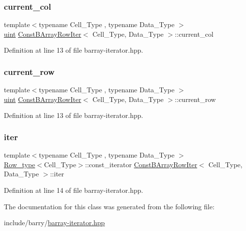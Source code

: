 \subsubsection{\texorpdfstring{current\+\_\+col}{current\_col}}
{\footnotesize\ttfamily template$<$typename Cell\+\_\+\+Type , typename Data\+\_\+\+Type $>$ \\
\hyperlink{typedefs_8hpp_a91ad9478d81a7aaf2593e8d9c3d06a14}{uint} \hyperlink{class_const_b_array_row_iter}{Const\+B\+Array\+Row\+Iter}$<$ Cell\+\_\+\+Type, Data\+\_\+\+Type $>$\+::current\+\_\+col}



Definition at line 13 of file barray-\/iterator.\+hpp.

\mbox{\label{class_const_b_array_row_iter_a6e12a5d0e899823179dd469d11f57b1a}} 
\subsubsection{\texorpdfstring{current\+\_\+row}{current\_row}}
{\footnotesize\ttfamily template$<$typename Cell\+\_\+\+Type , typename Data\+\_\+\+Type $>$ \\
\hyperlink{typedefs_8hpp_a91ad9478d81a7aaf2593e8d9c3d06a14}{uint} \hyperlink{class_const_b_array_row_iter}{Const\+B\+Array\+Row\+Iter}$<$ Cell\+\_\+\+Type, Data\+\_\+\+Type $>$\+::current\+\_\+row}



Definition at line 13 of file barray-\/iterator.\+hpp.

\mbox{\label{class_const_b_array_row_iter_ac01a8c0291ccc243bd4363bcbc5122a8}} 
\subsubsection{\texorpdfstring{iter}{iter}}
{\footnotesize\ttfamily template$<$typename Cell\+\_\+\+Type , typename Data\+\_\+\+Type $>$ \\
\hyperlink{typedefs_8hpp_a4deca4f3fb25a4da374818ab459b8b4a}{Row\+\_\+type}$<$Cell\+\_\+\+Type$>$\+::const\+\_\+iterator \hyperlink{class_const_b_array_row_iter}{Const\+B\+Array\+Row\+Iter}$<$ Cell\+\_\+\+Type, Data\+\_\+\+Type $>$\+::iter}



Definition at line 14 of file barray-\/iterator.\+hpp.



The documentation for this class was generated from the following file\+:\begin{DoxyCompactItemize}
\item 
include/barry/\hyperlink{barray-iterator_8hpp}{barray-\/iterator.\+hpp}\end{DoxyCompactItemize}
